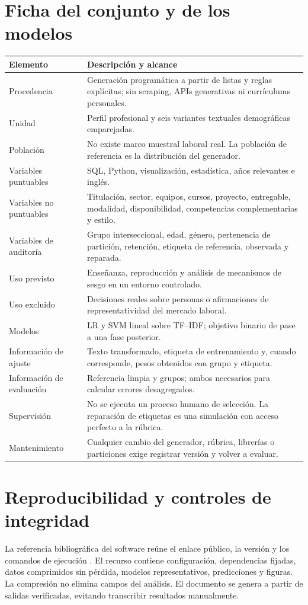 \documentclass[11pt,a4paper,oneside]{report}
\begin{document}
\chapter{Ficha del conjunto y de los modelos}
\begin{longtable}{p{3.2cm}p{10cm}}
\toprule Elemento & Descripción y alcance\\\midrule\endhead
Procedencia & Generación programática a partir de listas y reglas explícitas; sin scraping, APIs generativas ni currículums personales.\\
Unidad & Perfil profesional y seis variantes textuales demográficas emparejadas.\\
Población & No existe marco muestral laboral real. La población de referencia es la distribución del generador.\\
Variables puntuables & SQL, Python, visualización, estadística, años relevantes e inglés.\\
Variables no puntuables & Titulación, sector, equipos, cursos, proyecto, entregable, modalidad, disponibilidad, competencias complementarias y estilo.\\
Variables de auditoría & Grupo interseccional, edad, género, pertenencia de partición, retención, etiqueta de referencia, observada y reparada.\\
Uso previsto & Enseñanza, reproducción y análisis de mecanismos de sesgo en un entorno controlado.\\
Uso excluido & Decisiones reales sobre personas o afirmaciones de representatividad del mercado laboral.\\
Modelos & LR y SVM lineal sobre TF--IDF; objetivo binario de pase a una fase posterior.\\
Información de ajuste & Texto transformado, etiqueta de entrenamiento y, cuando corresponde, pesos obtenidos con grupo y etiqueta.\\
Información de evaluación & Referencia limpia y grupos; ambos necesarios para calcular errores desagregados.\\
Supervisión & No se ejecuta un proceso humano de selección. La reparación de etiquetas es una simulación con acceso perfecto a la rúbrica.\\
Mantenimiento & Cualquier cambio del generador, rúbrica, librerías o particiones exige registrar versión y volver a evaluar.\\\bottomrule
\end{longtable}

\chapter{Reproducibilidad y controles de integridad}
La referencia bibliográfica del software reúne el enlace público, la versión y los comandos de ejecución \cite{repositorio2026}. El recurso contiene configuración, dependencias fijadas, datos comprimidos sin pérdida, modelos representativos, predicciones y figuras. La compresión no elimina campos del análisis. El documento se genera a partir de salidas verificadas, evitando transcribir resultados manualmente.
\end{document}
